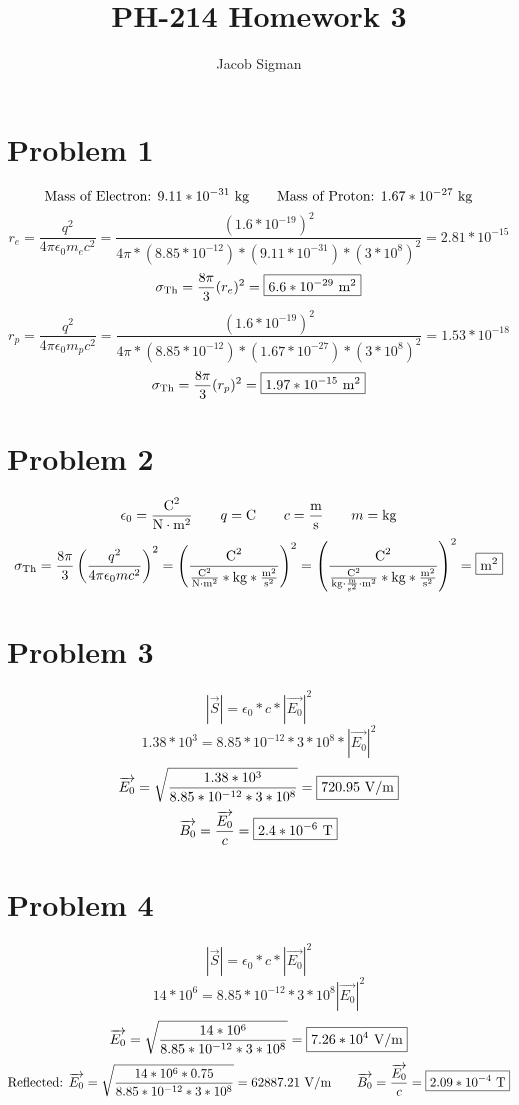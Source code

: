 \documentclass{article}
\title{PH-214 Homework 3}
\author{Jacob Sigman}
\date{}
\begin{document}
\maketitle
\section*{Problem 1}
\[\textnormal{Mass of Electron: }9.11*10^{-31}\textnormal{ kg}\hspace{7 mm}\textnormal{Mass of Proton: }1.67*10^{-27}\textnormal{ kg}\]
\[r_e=\frac{q^2}{4\pi\epsilon_0m_ec^2}=\frac{(1.6*10^{-19})^2}{4\pi*(8.85*10^{-12})*(9.11*10^{-31})*(3*10^8)^2}=2.81*10^{-15}\]
\[\sigma_\textnormal{Th}=\frac{8\pi}{3}(r_e)^2=\boxed{6.6*10^{-29}\textnormal{ m}^2}\]
\[r_p=\frac{q^2}{4\pi\epsilon_0m_pc^2}=\frac{(1.6*10^{-19})^2}{4\pi*(8.85*10^{-12})*(1.67*10^{-27})*(3*10^8)^2}=1.53*10^{-18}\]
\[\sigma_\textnormal{Th}=\frac{8\pi}{3}(r_p)^2=\boxed{1.97*10^{-15}\textnormal{ m}^2}\]
\section*{Problem 2}
\[\epsilon_0=\frac{\textnormal{C}^2}{\textnormal{N}\cdot\textnormal{m}^2}\hspace{7 mm}q=\textnormal{C}\hspace{7 mm}c=\frac{\textnormal{m}}{\textnormal{s}}\hspace{7 mm}m=\textnormal{kg}\]
\[\sigma_{\textnormal{Th}}=\frac{8\pi}{3}\left(\frac{q^2}{4\pi\epsilon_0mc^2}\right)^2=\left(\frac{\textnormal{C}^2}{\frac{\textnormal{C}^2}{\textnormal{N}\cdot\textnormal{m}^2}*\textnormal{kg}*\frac{\textnormal{m}^2}{\textnormal{s}^2}}\right)^2=\left(\frac{\textnormal{C}^2}{\frac{\textnormal{C}^2}{\textnormal{kg}\cdot\frac{\textnormal{m}}{\textnormal{s}^2}\cdot\textnormal{m}^2}*\textnormal{kg}*\frac{\textnormal{m}^2}{\textnormal{s}^2}}\right)^2=\boxed{\textnormal{m}^2}\]
\section*{Problem 3}
\[\left|\overrightarrow{S}\right|=\epsilon_0*c*\left|\overrightarrow{E_0}\right|^2\]
\[1.38*10^3=8.85*10^{-12}*3*10^8*\left|\overrightarrow{E_0}\right|^2\]
\[\overrightarrow{E_0}=\sqrt{\frac{1.38*10^3}{8.85*10^{-12}*3*10^8}}=\boxed{720.95\textnormal{ V/m}}\]
\[\overrightarrow{B_0}=\frac{\overrightarrow{E_0}}{c}=\boxed{2.4*10^{-6}\textnormal{ T}}\]
\section*{Problem 4}
\[\left|\overrightarrow{S}\right|=\epsilon_0*c*\left|\overrightarrow{E_0}\right|^2\]
\[14*10^6=8.85*10^{-12}*3*10^{8}\left|\overrightarrow{E_0}\right|^2\]
\[\overrightarrow{E_0}=\sqrt{\frac{14*10^6}{8.85*10^{-12}*3*10^8}}=\boxed{7.26*10^4 \textnormal{ V/m}}\]
\[\textnormal{Reflected: }\overrightarrow{E_0}=\sqrt{\frac{14*10^6*0.75}{8.85*10^{-12}*3*10^8}}=62887.21 \textnormal{ V/m}\hspace{7 mm}\overrightarrow{B_0}=\frac{\overrightarrow{E_0}}{c}=\boxed{2.09*10^{-4}\textnormal{ T}}\]
\[\]
\end{document}
